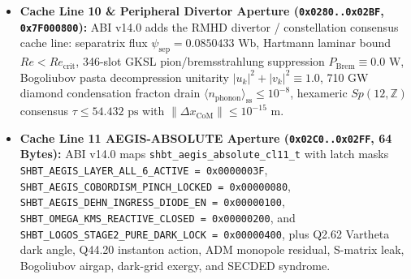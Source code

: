 \documentclass[11pt,onecolumn]{article}
\begin{document}
\begin{itemize}
Hydrodynamics \& Loss-Cone Invariants: \texttt{wd\_instanton\_action\_measured} ($S_{\text{instanton}} \ge 250.0$), \texttt{wd\_pycnonuclear\_rate\_cm3\_s} ($R_{\text{pyc}} \le 1.0 \times 10^{-120}\text{ cm}^{-3}\text{s}^{-1}$), \texttt{m\_dwarf\_dynamo\_attenuation\_db} ($\ge 120.0\text{ dB}$), \texttt{massive\_star\_opacity\_ratio} ($\kappa_{\text{eff}} / \kappa_0 \le 1.0 \times 10^{-12}$), \texttt{nsc\_tde\_penetration\_prob} ($P_{\text{TDE}} \le 1.0 \times 10^{-120}$), \texttt{async\_symplectic\_2form\_drift} ($\|d\omega\| \le 1.0 \times 10^{-19}$), \texttt{v11\_harvested\_nucleons\_counter} ($10^{12}$ baryons), and \texttt{v11\_reserved\_tail}. Cache Line 9 (\texttt{0x0240..0x027F}) maps the v12 \texttt{SHBT-MAR-OMEGA} Continuous-Flow Reactor \& Dual-Reactor Power Bus Arbiter registers: \texttt{mar\_omega\_gross\_power\_zw} ($1.00\text{--}10.00\text{ ZW}$), \texttt{mar\_omega\_slipstream\_ratio} ($f_{\text{slip}} \in [10^{-4}, 10^{-3}]$), \texttt{mar\_omega\_sensible\_heat\_kw} ($\le 245.0\text{ kW}$ at $21.13\text{ K}$), \texttt{mar\_omega\_throat\_stress\_mpa} ($< 10^{-6}\text{ MPa}$), \texttt{stellar\_harvest\_rate\_msun\_yr} ($\ge 20.0\,M_\odot/\text{yr}$), \texttt{wd\_effective\_coulomb\_gamma} ($\Gamma_{\text{eff}} < 175.0$), \texttt{ns\_cfl\_gap\_mev\_residual} ($\Delta_{\text{eff}} \to 0.0\text{ MeV}$), \texttt{power\_bus\_arbiter\_mode} (\texttt{0x01..0x06}), and \texttt{dual\_reactor\_status\_flags}.
    \item \textbf{Cache Line 10 \& Peripheral Divertor Aperture (\texttt{0x0280..0x02BF}, \texttt{0x7F000800}):} ABI v14.0 adds the RMHD divertor / constellation consensus cache line: separatrix flux $\psi_{\mathrm{sep}} = 0.0850433\text{ Wb}$, Hartmann laminar bound $Re < Re_{\mathrm{crit}}$, 346-slot GKSL pion/bremsstrahlung suppression $P_{\mathrm{Brem}} \equiv 0.0\text{ W}$, Bogoliubov pasta decompression unitarity $|u_k|^2 + |v_k|^2 \equiv 1.0$, 710 GW diamond condensation fracton drain $\langle n_{\mathrm{phonon}}\rangle_{\mathrm{ss}} \le 10^{-8}$, hexameric $Sp(12,\mathbb{Z})$ consensus $\tau \le 54.432\text{ ps}$ with $\lVert\Delta x_{\mathrm{CoM}}\rVert \le 10^{-15}\text{ m}$.
    \item \textbf{Cache Line 11 AEGIS-ABSOLUTE Aperture (\texttt{0x02C0..0x02FF}, 64 Bytes):} ABI v14.0 maps \texttt{shbt\_aegis\_absolute\_cl11\_t} with latch masks \texttt{SHBT\_AEGIS\_LAYER\_ALL\_6\_ACTIVE = 0x0000003F}, \texttt{SHBT\_AEGIS\_COBORDISM\_PINCH\_LOCKED = 0x00000080}, \texttt{SHBT\_AEGIS\_DEHN\_INGRESS\_DIODE\_EN = 0x00000100}, \texttt{SHBT\_OMEGA\_KMS\_REACTIVE\_CLOSED = 0x00000200}, and \texttt{SHBT\_LOGOS\_STAGE2\_PURE\_DARK\_LOCK = 0x00000400}, plus Q2.62 Vartheta dark angle, Q44.20 instanton action, ADM monopole residual, S-matrix leak, Bogoliubov airgap, dark-grid exergy, and SECDED syndrome.

\end{itemize}
\end{document}
